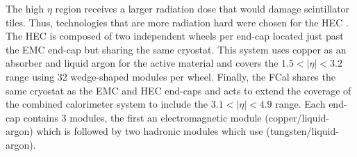 The high $\eta$ region receives a larger radiation dose that would damage
scintillator tiles. Thus, technologies that are more radiation hard were chosen
for the HEC \cite{CERN-LHCC-96-041}. The HEC is composed of two independent
wheels per end-cap located just past the EMC end-cap but sharing the same
cryostat. This system  uses copper as an absorber and liquid argon for the
active material and covers the $1.5 < |\eta| < 3.2$ range using 32 wedge-shaped
modules per wheel. Finally, the FCal shares the same cryostat as the EMC and
HEC end-caps and acts to extend the coverage of the combined calorimeter system
to include the $3.1 < |\eta| < 4.9$ range.  Each end-cap contains 3 modules,
the first an electromagnetic module (copper/liquid-argon) which is followed by
two hadronic modules which use (tungsten/liquid-argon).
